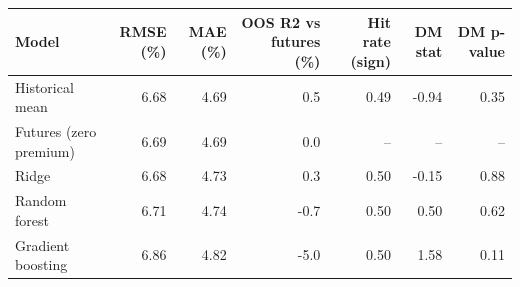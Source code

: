 \begin{tabular}{lrrrrrr}
\toprule
Model & RMSE (\%) & MAE (\%) & OOS R2 vs futures (\%) & Hit rate (sign) & DM stat & DM p-value \\
\midrule
Historical mean & 6.68 & 4.69 & 0.5 & 0.49 & -0.94 & 0.35 \\
Futures (zero premium) & 6.69 & 4.69 & 0.0 & -- & -- & -- \\
Ridge & 6.68 & 4.73 & 0.3 & 0.50 & -0.15 & 0.88 \\
Random forest & 6.71 & 4.74 & -0.7 & 0.50 & 0.50 & 0.62 \\
Gradient boosting & 6.86 & 4.82 & -5.0 & 0.50 & 1.58 & 0.11 \\
\bottomrule
\end{tabular}
